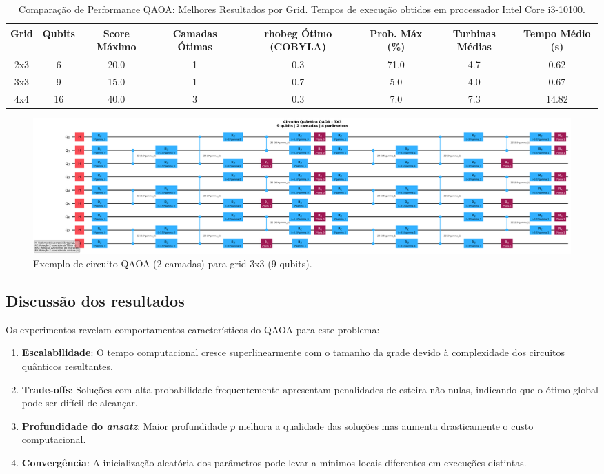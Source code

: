 \documentclass{weciq}
\begin{document}
\begin{table}[htbp]
\centering
\caption{Comparação de Performance QAOA: Melhores Resultados por Grid. Tempos de execução obtidos em processador Intel Core i3-10100.}
\label{tab:benchmark_comparison}
\footnotesize
\begin{tabular}{|c|c|c|c|c|c|c|c|}
\hline
\textbf{Grid} & \textbf{Qubits} & \textbf{Score Máximo} & \textbf{Camadas Ótimas} & \textbf{rhobeg Ótimo (COBYLA)} & \textbf{Prob. Máx (\%)} & \textbf{Turbinas Médias} & \textbf{Tempo Médio (s)} \\
\hline
2x3 & 6 & 20.0 & 1 & 0.3 & 71.0 & 4.7 & 0.62 \\
3x3 & 9 & 15.0 & 1 & 0.7 & 5.0 & 4.0 & 0.67 \\
4x4 & 16 & 40.0 & 3 & 0.3 & 7.0 & 7.3 & 14.82 \\
\hline
\end{tabular}
\end{table}

\begin{figure}[htb]
\centering
\includegraphics[width=0.95\linewidth]{quantum_circuit_3x3_9qubits_2layers_20250813_095137.png}
\caption{Exemplo de circuito QAOA (2 camadas) para grid 3x3 (9 qubits).}
\end{figure}

\subsection*{Discussão dos resultados}
Os experimentos revelam comportamentos característicos do QAOA para este problema:
\begin{enumerate}
\item \textbf{Escalabilidade}: O tempo computacional cresce superlinearmente com o tamanho da grade devido à complexidade dos circuitos quânticos resultantes.
\item \textbf{Trade-offs}: Soluções com alta probabilidade frequentemente apresentam penalidades de esteira não-nulas, indicando que o ótimo global pode ser difícil de alcançar.
\item \textbf{Profundidade do \textit{ansatz}}: Maior profundidade $p$ melhora a qualidade das soluções mas aumenta drasticamente o custo computacional.
\item \textbf{Convergência}: A inicialização aleatória dos parâmetros pode levar a mínimos locais diferentes em execuções distintas.
\end{enumerate}
\end{document}
